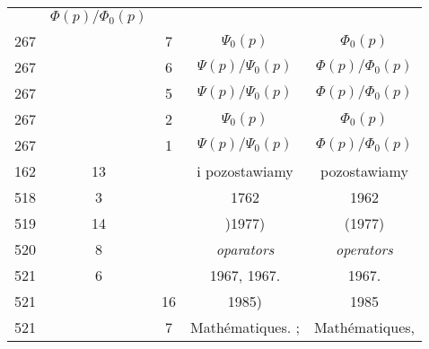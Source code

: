 \documentclass[a4paper,11pt]{article}
\begin{document}
\begin{center}
\begin{tabular}{|c|c|c|c|c|}
           & $\Phi( p ) / \Phi_{ 0 }( p )$ \\
    267 & & \hphantom{0}7 & $\Psi_{ 0 }( p )$ & $\Phi_{ 0 }( p )$ \\
    267 & & \hphantom{0}6 & $\Psi( p ) / \Psi_{ 0 }( p )$
           & $\Phi( p ) / \Phi_{ 0 }( p )$ \\
    267 & & \hphantom{0}5 & $\Psi( p ) / \Psi_{ 0 }( p )$
           & $\Phi( p ) / \Phi_{ 0 }( p )$ \\
    267 & & \hphantom{0}2 & $\Psi_{ 0 }( p )$ & $\Phi_{ 0 }( p )$ \\
    267 & & \hphantom{0}1 & $\Psi( p ) / \Psi_{ 0 }( p )$
           & $\Phi( p ) / \Phi_{ 0 }( p )$ \\
    162 & 13 & & i pozostawiamy & pozostawiamy \\
    518 & \hphantom{0}3 & & 1762 & 1962 \\
    519 & 14 & & )1977) & (1977) \\
    520 & \hphantom{0}8 & & \textit{oparators} & \textit{operators} \\
    521 & \hphantom{0}6 & & 1967, 1967. & 1967. \\
    521 & & 16 & 1985) & 1985 \\
    521 & & \hphantom{0}7 & Math\'{e}matiques. ; & Math\'{e}matiques, \\
    \hline
  \end{tabular}





  \newpage


\end{center}
\end{document}
